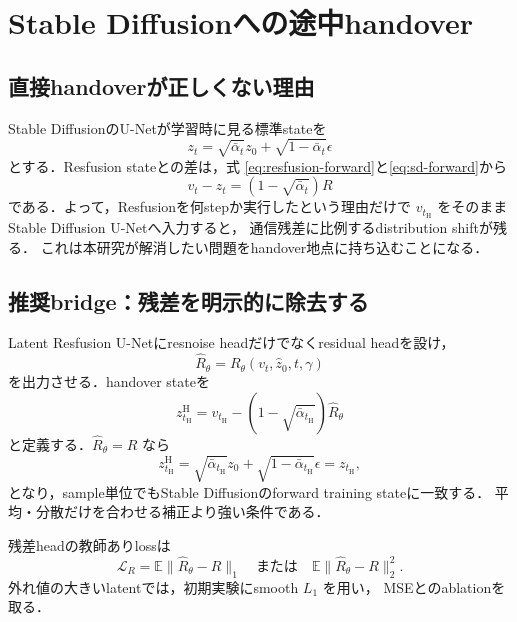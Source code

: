 \documentclass[11pt,a4paper]{ltjsarticle}
\newcommand{\E}{\mathbb{E}}
\begin{document}
\section{Stable Diffusionへの途中handover}

\subsection{直接handoverが正しくない理由}

Stable DiffusionのU-Netが学習時に見る標準stateを
\begin{equation}
  z_t
  =
  \sqrt{\bar\alpha_t}z_0
  +
  \sqrt{1-\bar\alpha_t}\epsilon
\label{eq:sd-forward}
\end{equation}
とする．Resfusion stateとの差は，式
\eqref{eq:resfusion-forward}と\eqref{eq:sd-forward}から
\begin{equation}
  v_t-z_t
  =
  (1-\sqrt{\bar\alpha_t})R
\label{eq:handover-gap}
\end{equation}
である．よって，Resfusionを何stepか実行したという理由だけで
\(v_{t_{\mathrm H}}\) をそのままStable Diffusion U-Netへ入力すると，
通信残差に比例するdistribution shiftが残る．
これは本研究が解消したい問題をhandover地点に持ち込むことになる．

\subsection{推奨bridge：残差を明示的に除去する}

Latent Resfusion U-Netにresnoise headだけでなくresidual headを設け，
\[
  \hat R_\theta
  =
  R_\theta(v_t,\hat z_0,t,\gamma)
\]
を出力させる．handover stateを
\begin{equation}
  z^{\mathrm H}_{t_{\mathrm H}}
  =
  v_{t_{\mathrm H}}
  -
  (1-\sqrt{\bar\alpha_{t_{\mathrm H}}})
  \hat R_\theta
\label{eq:bridge}
\end{equation}
と定義する．\(\hat R_\theta=R\) なら
\[
  z^{\mathrm H}_{t_{\mathrm H}}
  =
  \sqrt{\bar\alpha_{t_{\mathrm H}}}z_0
  +\sqrt{1-\bar\alpha_{t_{\mathrm H}}}\epsilon
  =z_{t_{\mathrm H}},
\]
となり，sample単位でもStable Diffusionのforward training stateに一致する．
平均・分散だけを合わせる補正より強い条件である．

残差headの教師ありlossは
\begin{equation}
  \mathcal L_R
  =
  \E\lVert \hat R_\theta-R\rVert_1
  \quad\text{または}\quad
  \E\lVert \hat R_\theta-R\rVert_2^2 .
\label{eq:residual-loss}
\end{equation}
外れ値の大きいlatentでは，初期実験にsmooth \(L_1\) を用い，
MSEとのablationを取る．
\end{document}
